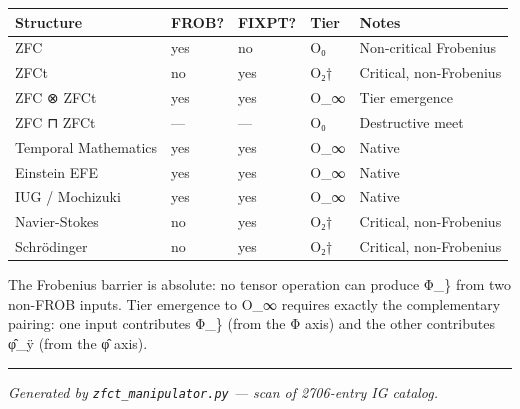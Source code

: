 {\def\LTcaptype{none} %
\begin{longtable}[]{@{}lllll@{}}
\toprule\noalign{}
Structure & FROB? & FIXPT? & Tier & Notes \\
\midrule\noalign{}
\endhead
\bottomrule\noalign{}
\endlastfoot
ZFC & yes & no & O₀ & Non-critical Frobenius \\
ZFCt & no & yes & O₂† & Critical, non-Frobenius \\
ZFC {\igprimfont\upshape ⊗} ZFCt & yes & yes & O\_∞ & Tier emergence \\
ZFC ⊓ ZFCt & --- & --- & O₀ & Destructive meet \\
Temporal Mathematics & yes & yes & O\_∞ & Native \\
Einstein EFE & yes & yes & O\_∞ & Native \\
IUG / Mochizuki & yes & yes & O\_∞ & Native \\
Navier-Stokes & no & yes & O₂† & Critical, non-Frobenius \\
Schrödinger & no & yes & O₂† & Critical, non-Frobenius \\
\end{longtable}
}

The Frobenius barrier is absolute: no tensor operation can produce Φ\_\}
from two non-FROB inputs. Tier emergence to O\_∞ requires exactly the
complementary pairing: one input contributes Φ\_\} (from the Φ axis) and
the other contributes φ̂\_ÿ (from the φ̂ axis).

\begin{center}\rule{0.5\linewidth}{0.5pt}\end{center}

\emph{Generated by \texttt{zfct\_manipulator.py} --- scan of 2706-entry
IG catalog.}
